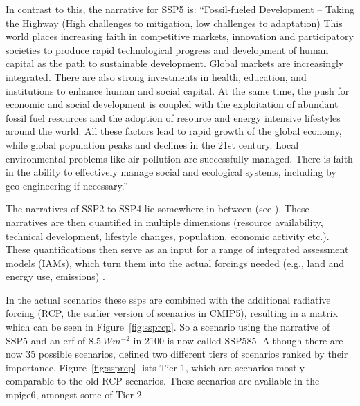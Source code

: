 In contrast to this, the narrative for SSP5 is:
  \enquote{Fossil-fueled Development – Taking the Highway (High challenges to mitigation, low challenges to adaptation) This world places increasing faith in competitive markets, innovation and participatory societies to produce rapid technological progress and development of human capital as the path to sustainable development. Global markets are increasingly integrated. There are also strong investments in health, education, and institutions to enhance human and social capital. At the same time, the push for economic and social development is coupled with the exploitation of abundant fossil fuel resources and the adoption of resource and energy intensive lifestyles around the world. All these factors lead to rapid growth of the global economy, while global population peaks and declines in the 21st century. Local environmental problems like air pollution are successfully managed. There is faith in the ability to effectively manage social and ecological systems, including by geo-engineering if necessary.} \cite{riahi_shared_2017}

The narratives of SSP2 to SSP4 lie somewhere in between (see \cite{riahi_shared_2017}). 
These narratives are then quantified in multiple dimensions (resource availability, technical development, lifestyle changes, population, economic activity etc.). 
These quantifications then serve as an input for a range of integrated assessment models (IAMs), which turn them into the actual forcings needed (e.g., land and energy use, emissions) \cite{riahi_shared_2017}. 

In the actual scenarios these \acp{ssp} are combined with the additional radiative forcing (RCP, the earlier version of scenarios in CMIP5), resulting in a matrix which can be seen in Figure~\ref{fig:ssprcp}. 
So a scenario using the narrative of SSP5 and an \ac{erf} of $8.5~Wm^{-2}$ in 2100 is now called SSP585. 
Although there are now 35 possible scenarios, \citeauthor{oneill_scenario_2016} defined two different tiers of scenarios ranked by their importance. 
Figure~\ref{fig:ssprcp} lists Tier 1, which are scenarios mostly comparable to the old RCP scenarios. 
These scenarios are available in the \ac{mpige6}, amongst some of Tier 2. \cite{oneill_scenario_2016, riahi_shared_2017, bottinger_michael_ssp_nodate}

